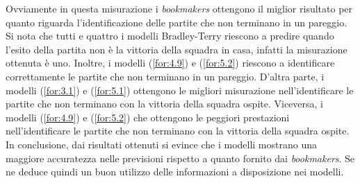 Ovviamente in questa misurazione i \emph{bookmakers} ottengono il miglior risultato per quanto riguarda l'identificazione delle partite che non terminano in un pareggio. Si nota che tutti e quattro i modelli Bradley-Terry riescono a predire quando l'esito della partita non è la vittoria della squadra in casa, infatti la misurazione ottenuta è uno. Inoltre, i modelli (\ref{for:4.9}) e (\ref{for:5.2}) riescono a identificare correttamente le partite che non terminano in un pareggio. D’altra parte, i modelli (\ref{for:3.1}) e (\ref{for:5.1}) ottengono le migliori misurazione nell'identificare le partite che non terminano con la vittoria della squadra ospite. Viceversa, i modelli (\ref{for:4.9}) e (\ref{for:5.2}) che ottengono le peggiori prestazioni nell'identificare le partite che non terminano con la vittoria della squadra ospite.\\
In conclusione, dai risultati ottenuti si evince che i modelli mostrano una maggiore accuratezza nelle previsioni rispetto a quanto fornito dai \emph{bookmakers}. Se ne deduce quindi un buon utilizzo delle informazioni a disposizione nei modelli.



